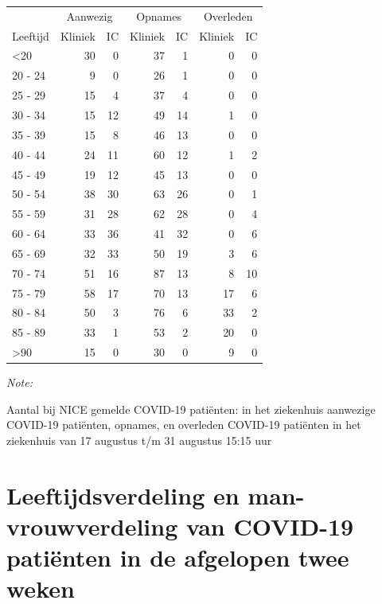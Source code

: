 \documentclass[
  english,
  man,floatsintext]{apa6}
\begin{document}
\begin{table}
\centering\begingroup\fontsize{10}{12}\selectfont

\begin{threeparttable}
\begin{tabular}{lrrrrrr}
\toprule
\multicolumn{1}{c}{ } & \multicolumn{2}{c}{Aanwezig} & \multicolumn{2}{c}{Opnames} & \multicolumn{2}{c}{Overleden} \\
\cmidrule(l{3pt}r{3pt}){2-3} \cmidrule(l{3pt}r{3pt}){4-5} \cmidrule(l{3pt}r{3pt}){6-7}
Leeftijd & Kliniek & IC & Kliniek & IC & Kliniek & IC\\
\midrule
<20 & 30 & 0 & 37 & 1 & 0 & 0\\
20 - 24 & 9 & 0 & 26 & 1 & 0 & 0\\
25 - 29 & 15 & 4 & 37 & 4 & 0 & 0\\
30 - 34 & 15 & 12 & 49 & 14 & 1 & 0\\
35 - 39 & 15 & 8 & 46 & 13 & 0 & 0\\
40 - 44 & 24 & 11 & 60 & 12 & 1 & 2\\
45 - 49 & 19 & 12 & 45 & 13 & 0 & 0\\
50 - 54 & 38 & 30 & 63 & 26 & 0 & 1\\
55 - 59 & 31 & 28 & 62 & 28 & 0 & 4\\
60 - 64 & 33 & 36 & 41 & 32 & 0 & 6\\
65 - 69 & 32 & 33 & 50 & 19 & 3 & 6\\
70 - 74 & 51 & 16 & 87 & 13 & 8 & 10\\
75 - 79 & 58 & 17 & 70 & 13 & 17 & 6\\
80 - 84 & 50 & 3 & 76 & 6 & 33 & 2\\
85 - 89 & 33 & 1 & 53 & 2 & 20 & 0\\
>90 & 15 & 0 & 30 & 0 & 9 & 0\\
\bottomrule
\end{tabular}
\begin{tablenotes}
\item \textit{Note: } 
\item Aantal bij NICE gemelde COVID-19 patiënten: in het ziekenhuis aanwezige COVID-19 patiënten, opnames, en overleden COVID-19 patiënten in het ziekenhuis van 17 augustus t/m 31 augustus 15:15 uur
\end{tablenotes}
\end{threeparttable}
\endgroup{}
\end{table}

\newpage

\hypertarget{leeftijdsverdeling-en-man-vrouwverdeling-van-covid-19-patiuxebnten-in-de-afgelopen-twee-weken}{%
\section{Leeftijdsverdeling en man-vrouwverdeling van COVID-19 patiënten in de afgelopen twee weken}\label{leeftijdsverdeling-en-man-vrouwverdeling-van-covid-19-patiuxebnten-in-de-afgelopen-twee-weken}}
\end{document}

